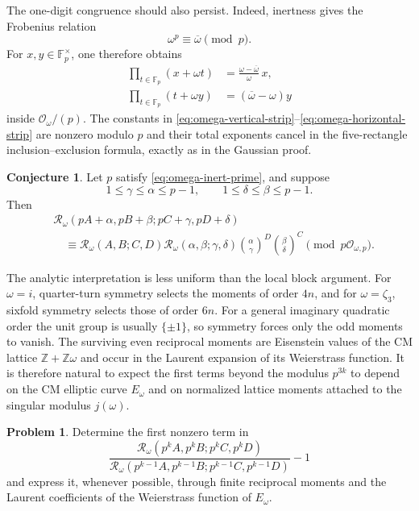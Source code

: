 \documentclass[a4paper,american,11pt]{amsart}
\numberwithin{equation}{section}
\theoremstyle{definition}
\newtheorem{problem}[theorem]{Problem}
\newtheorem{conjecture}[theorem]{Conjecture}
\newcommand{\Z}{\mathbb Z}
\newcommand{\F}{\mathbb F}
\begin{document}
The one-digit congruence should also persist.  Indeed, inertness gives the Frobenius
relation
\[
\omega^p\equiv\overline\omega\pmod p.
\]
For $x,y\in\F_p^\times$, one therefore obtains
\begin{align}
\prod_{t\in\F_p}(x+\omega t)
&=
\frac{\omega-\overline\omega}{\omega}\,x,
\label{eq:omega-vertical-strip}\\
\prod_{t\in\F_p}(t+\omega y)
&=
(\overline\omega-\omega)y
\label{eq:omega-horizontal-strip}
\end{align}
inside $\mathcal O_\omega/(p)$.  The constants in
\eqref{eq:omega-vertical-strip}--\eqref{eq:omega-horizontal-strip} are nonzero modulo
$p$ and their total exponents cancel in the five-rectangle inclusion--exclusion
formula, exactly as in the Gaussian proof.

\begin{conjecture}
\label{conj:omega-bailey}
Let $p$ satisfy \eqref{eq:omega-inert-prime}, and suppose
\[
1\leq\gamma\leq\alpha\leq p-1,
\qquad
1\leq\delta\leq\beta\leq p-1.
\]
Then
\[
\begin{aligned}
&\mathcal R_\omega
(pA+\alpha,pB+\beta;pC+\gamma,pD+\delta)
\\
&\quad\equiv
\mathcal R_\omega(A,B;C,D)
\mathcal R_\omega(\alpha,\beta;\gamma,\delta)
\binom{\alpha}{\gamma}^{D}
\binom{\beta}{\delta}^{C}
\pmod{p\mathcal O_{\omega,p}}.
\end{aligned}
\]    
\end{conjecture}





The analytic interpretation is less uniform than the local block argument.  For
$\omega=i$, quarter-turn symmetry selects the moments of order $4n$, and for
$\omega=\zeta_3$, sixfold symmetry selects those of order $6n$.  For a general
imaginary quadratic order the unit group is usually $\{\pm1\}$, so symmetry forces
only the odd moments to vanish.  The surviving even reciprocal moments are Eisenstein
values of the CM lattice $\Z+\Z\omega$ and occur in the Laurent expansion of its
Weierstrass function.  It is therefore natural to expect the first terms beyond the
modulus $p^{3k}$ to depend on the CM elliptic curve $E_\omega$ and on normalized
lattice moments attached to the singular modulus $j(\omega)$.

\begin{problem}\label{prob:omega-cm-corrections}
Determine the first nonzero term in
\[
\frac{
\mathcal R_\omega(p^kA,p^kB;p^kC,p^kD)
}{
\mathcal R_\omega(p^{k-1}A,p^{k-1}B;p^{k-1}C,p^{k-1}D)
}-1
\]
and express it, whenever possible, through finite reciprocal moments and the Laurent
coefficients of the Weierstrass function of $E_\omega$.
\end{problem}
\end{document}
